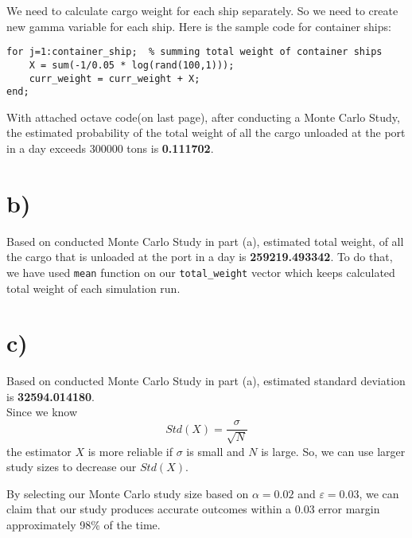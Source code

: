 \documentclass[12pt]{article}
\begin{document}
We need to calculate cargo weight for each ship separately. So we need to create new gamma variable for each ship. Here is the sample code for container ships:

\begin{lstlisting}[style=Matlab-editor]
for j=1:container_ship;  % summing total weight of container ships
    X = sum(-1/0.05 * log(rand(100,1)));
    curr_weight = curr_weight + X;
end;
\end{lstlisting}

With attached octave code(on last page), after conducting a Monte Carlo Study, the estimated probability of the total weight of all the cargo unloaded at the port in a day exceeds 300000 tons is \textbf{0.111702}.

\section*{b)}
Based on conducted Monte Carlo Study in part (a), estimated  total weight, of all the cargo that is unloaded at the port in a day is \textbf{259219.493342}. To do that, we have used \texttt{mean} function on our \texttt{total\_weight} vector which keeps calculated total weight of each simulation run.

\section*{c)}
Based on conducted Monte Carlo Study in part (a), estimated  standard deviation is \textbf{32594.014180}.\\

Since we know $$Std(X) = \dfrac{\sigma}{\sqrt{N}}$$
the estimator $X$ is more reliable if $\sigma$ is small and $N$ is large. So, we can use larger study sizes to decrease our $Std(X)$.

By selecting our Monte Carlo study size based on $\alpha = 0.02$ and $\varepsilon = 0.03$, we can claim that our study produces accurate outcomes within a 0.03 error margin approximately 98\% of the time.
\end{document}
